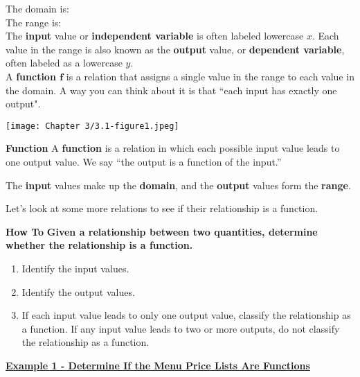 \documentclass[12pt]{book}
\begin{document}
The domain is: 
\\

The range is: 
\\

The \textbf{input} value or \textbf{independent variable} is often labeled lowercase $x$. Each value in the range is also known as the \textbf{output} value, or \textbf{dependent variable}, often labeled as a lowercase $y$.
\\

A \textbf{function $\mathbf{f}$} is a relation that assigns a single value in the range to each value in the domain. A way you can think about it is that ``each input has exactly one output".  
\\

\centerline{\texttt{[image: Chapter 3/3.1-figure1.jpeg]}}

    \newpage
\begin{boxR}
    \textbf{Function}
    \vspace{1mm}
    \hline
    \vspace{2mm}
    A \textbf{function} is a relation in which each possible input value leads to one output value. We say “the output is a function of the input.”

    The \textbf{input} values make up the \textbf{domain}, and the \textbf{output} values form the \textbf{range}.
\end{boxR}

Let's look at some more relations to see if their relationship is a function.

\begin{boxR}
    \textbf{How To}
    \vspace{1mm}
    \hline
    \vspace{2mm}
    \textbf{Given a relationship between two quantities, determine whether the relationship is a function.}
    
    \begin{enumerate}
        \item Identify the input values.
        \item Identify the output values.
        \item If each input value leads to only one output value, classify the relationship as a function. If any input value leads to two or more outputs, do not classify the relationship as a function.
    \end{enumerate}
\end{boxR}
\vspace{3mm}
   \underline{\textbf{Example 1 - Determine If the Menu Price Lists Are Functions}}
\end{document}
